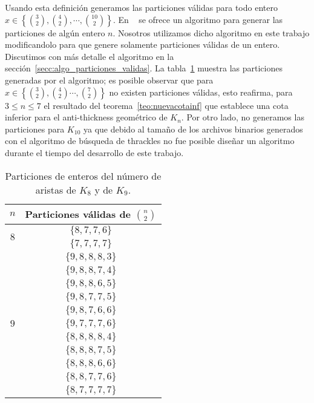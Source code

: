    Usando esta definición generamos las particiones válidas para todo entero
    $x\in \left\{ \binom{3}{2}, \binom{4}{2}, \cdots, \binom{10}{2}\right\}$.
    En ~\cite{Knuth2011} se ofrece un algoritmo para
    generar las particiones de algún entero $n$. Nosotros utilizamos
    dicho algoritmo en este trabajo modificandolo para que genere solamente
    particiones válidas de un entero. Discutimos con más detalle el algoritmo en
    la sección~\ref{secc:algo_particiones_validas}.
    La tabla~\ref{tabla:particionesk8k9} muestra las particiones generadas por el
    algoritmo; es posible observar que para $x\in \left\{\binom{3}{2},\binom{4}{2}
    \cdots,\binom{7}{2}\right\}$ no existen particiones válidas, esto reafirma,
    para $ 3\leq n\leq 7$ el resultado del teorema~\ref{teo:nuevacotainf}
    que establece una cota inferior para el anti-thickness geométrico de $K_n$. Por otro lado,
    no generamos las particiones para $K_10$ ya que debido al tamaño de los archivos binarios
    generados con el algoritmo de búsqueda de thrackles no fue posible diseñar un algoritmo durante
    el tiempo del desarrollo de este trabajo.
    \begin{table}[t]
      \centering
      \begin{tabular}{|c|c|}
        \hline
        $n$                       & Particiones válidas de $\displaystyle\binom{n}{2}$ \\ \hline\hline
        \multirow{2}{*}{$ 8 $}    & $\{8,7,7,6\}$ \\ \cline{2-2}
                                  & $\{7,7,7,7\}$ \\ \hline
        \multirow{11}{*}{$ 9 $}   &$\{9,8,8,8,3\}$ \\ \cline{2-2}
                                  &$\{9,8,8,7,4\}$ \\ \cline{2-2}
                                  &$\{9,8,8,6,5\}$ \\ \cline{2-2}
                                  &$\{9,8,7,7,5\}$ \\ \cline{2-2}
                                  &$\{9,8,7,6,6\}$ \\ \cline{2-2}
                                  &$\{9,7,7,7,6\}$ \\ \cline{2-2}
                                  &$\{8,8,8,8,4\}$ \\ \cline{2-2}
                                  &$\{8,8,8,7,5\}$ \\ \cline{2-2}
                                  &$\{8,8,8,6,6\}$ \\ \cline{2-2}
                                  &$\{8,8,7,7,6\}$ \\ \cline{2-2}
                                  &$\{8,7,7,7,7\}$ \\ \hline
      \end{tabular}
      \caption{Particiones de enteros del número de aristas de $K_8$ y de $K_9$. }
      \label{tabla:particionesk8k9}
    \end{table}

